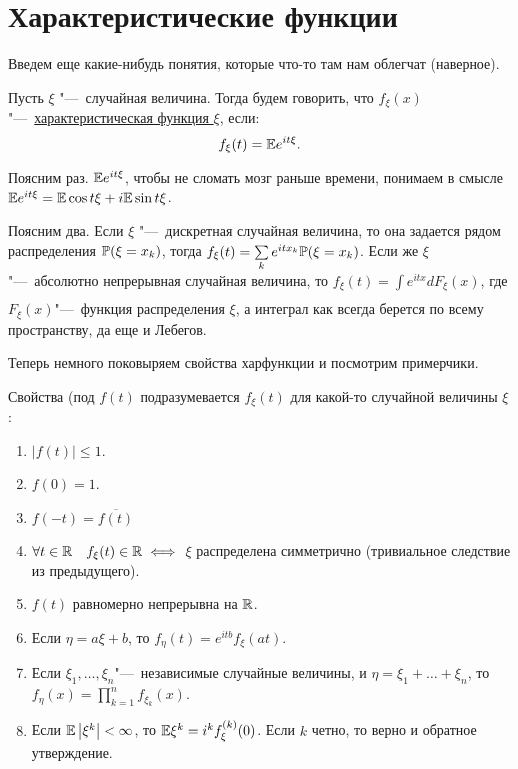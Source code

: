 \documentclass[../TV&MS.tex]{subfiles}
\begin{document}
\section{Характеристические функции}

Введем еще какие-нибудь понятия, которые что-то там нам облегчат (наверное).

\begin{Def}
    Пусть $\xi$ "---~случайная величина. Тогда будем говорить, что $f_\xi \left( x \right) $ "---~\uline{характеристическая функция $\xi$}, если:
    \[
        f_\xi(t) = \mathbb{E} e^{it\xi}
    .\] 
\end{Def} 

Поясним раз.  $\mathbb{E} e^{it\xi}$, чтобы не сломать мозг раньше времени, понимаем в смысле
$\mathbb{E} e^{it\xi} = \mathbb{E} \cos{t\xi} + i\mathbb{E} \sin{t\xi}$.

Поясним два. Если $\xi$ "---~дискретная случайная величина, то она задается рядом
распределения $\mathbb{P}(\xi = x_k)$, тогда  $f_\xi(t) = \sum\limits_{k}^{} e^{itx_k} \mathbb{P}(\xi = x_k)$. Если же $\xi$"---~абсолютно непрерывная случайная величина, 
то  $f_\xi(t) = \int\limits_{}^{} e^{itx} dF_\xi(x)$, где $F_\xi(x)$"---~функция распределения $\xi$, а интеграл как всегда берется по всему пространству, да еще и Лебегов.

Теперь немного поковыряем свойства харфункции и посмотрим примерчики.

Свойства (под $f(t)$ подразумевается $f_\xi(t)$ для какой-то случайной величины $\xi$:

\begin{enumerate}
    \item $ \left| f(t) \right| \leqslant 1 $.
    \item $f(0) = 1$.
    \item $f(-t) = \overline{f(t)}$ 
    \item $\forall t \in \mathbb{R} \quad f_\xi(t) \in \mathbb{R} \iff$  $\xi$ распределена симметрично (тривиальное следствие из предыдущего).
    \item\label{ravnepr} $f(t)$ равномерно непрерывна на $\mathbb{R}$.
    \item Если $\eta = a\xi + b$, то $f_\eta(t) = e^{itb}f_\xi(at)$.
    \item\label{nez} Если $\xi_1,  \ldots , \xi_n$"---~независимые случайные величины, и 
    $\eta = \xi_1 +  \ldots + \xi_n$, то $f_\eta(x) = \prod\limits_{k=1}^{n} 
    f_{\xi_k}(x)$.
    \item\label{moments} Если $\mathbb{E} \left|\xi^k\right| < \infty$, то 
    $\mathbb{E} \xi^k = i^k f^{(k)}_\xi(0)$.
    Если $k$ четно, то верно и обратное утверждение.
\end{enumerate}
\end{document}
